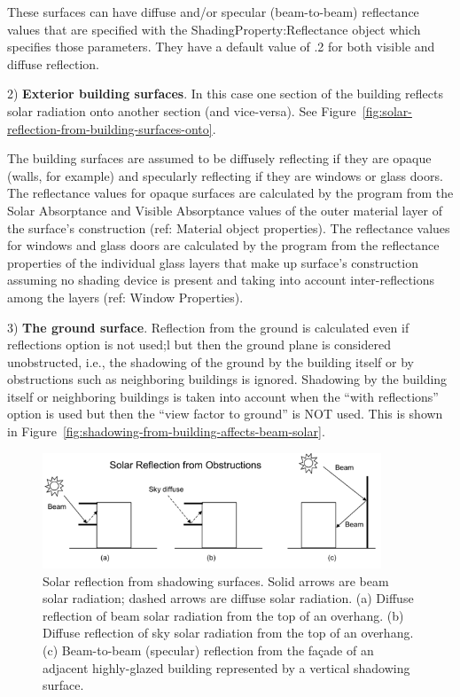 These surfaces can have diffuse and/or specular (beam-to-beam) reflectance values that are specified with the Shad\-ing\-Property:\-Re\-flectance object which specifies those parameters. They have a default value of .2 for both visible and diffuse reflection.

2) \textbf{Exterior building surfaces}. In this case one section of the building reflects solar radiation onto another section (and vice-versa). See Figure~\ref{fig:solar-reflection-from-building-surfaces-onto}.

The building surfaces are assumed to be diffusely reflecting if they are opaque (walls, for example) and specularly reflecting if they are windows or glass doors. The reflectance values for opaque surfaces are calculated by the program from the Solar Absorptance and Visible Absorptance values of the outer material layer of the surface's construction (ref: Material object properties). The reflectance values for windows and glass doors are calculated by the program from the reflectance properties of the individual glass layers that make up surface's construction assuming no shading device is present and taking into account inter-reflections among the layers (ref: Window Properties).

3) \textbf{The ground surface}. Reflection from the ground is calculated even if reflections option is not used;l but then the ground plane is considered unobstructed, i.e., the shadowing of the ground by the building itself or by obstructions such as neighboring buildings is ignored. Shadowing by the building itself or neighboring buildings is taken into account when the ``with reflections'' option is used but then the ``view factor to ground'' is NOT used. This is shown in Figure~\ref{fig:shadowing-from-building-affects-beam-solar}.

\begin{figure}[hbtp] %
\centering
\includegraphics[width=0.9\textwidth, height=0.9\textheight, keepaspectratio=true]{media/image003.png}
\caption{  Solar reflection from shadowing surfaces. Solid arrows are beam solar radiation; dashed arrows are diffuse solar radiation. (a) Diffuse reflection of beam solar radiation from the top of an overhang. (b) Diffuse reflection of sky solar radiation from the top of an overhang. (c) Beam-to-beam (specular) reflection from the façade of an adjacent highly-glazed building represented by a vertical shadowing surface. \protect \label{fig:solar-reflection-from-shadowing-surfaces.}}
\end{figure}

